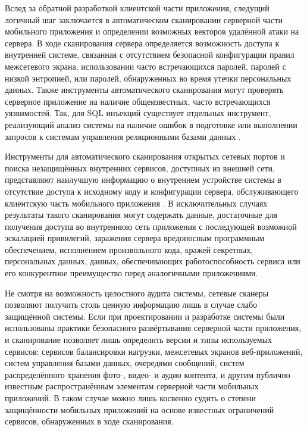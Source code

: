 Вслед за обратной разработкой клиентской части приложения, следущий логичный шаг заключается в автоматическом сканировании серверной части мобильного приложения и определении возможных векторов удалённой атаки на сервера. В ходе сканирования сервера определяется возможность доступа к внутренней системе, связанная с отсутствием безопасной конфигурации правил межсетевого экрана, использовании часто встречающихся паролей, паролей с низкой энтропией, или паролей, обнаруженных во время утечки персональных данных. Также инструменты автоматического сканирования могут проверять серверное приложение на наличие общеизвестных, часто встречающихся уязвимостей. Так, для SQL инъекций существует отдельных инструмент, реализующий анализ системы на наличие ошибок в подготовке или выполнении запросов к системам управления реляционными базами данных \cite{sqlmap}.

Инструменты для автоматического сканирования открытых сетевых портов и поиска незащищённых внутренних сервисов, доступных из внешней сети, представляют наилучшую информацию о внутреннем устройстве системы в отсутствие доступа к исходному коду и конфигурации сервера, обслуживающего клиентскую часть мобильного приложения \cite{portswigger_burp}. В исключительных случаях результаты такого сканирования могут содержать данные, достаточные для получения доступа во внутреннюю сеть приложения с последующей возможной эскалацией привилегий, заражения сервера вредоносным программным обеспечением, исполнением произвольного кода, кражей секретных, персональных данных, данных, обеспечивающих работоспособность сервиса или его конкурентное преимущество перед аналогичными приложениями.

Не смотря на возможность целостного аудита системы, сетевые сканеры позволяют получить столь ценную информацию лишь в случае слабо защищённой системы. Если при проектировании и разработке системы были использованы практики безопасного развёртывания серверной части приложения, и сканирование позволяет лишь определить версии и типы используемых сервисов: сервисов балансировки нагрузки, межсетевых экранов веб-приложений, систем управления базами данных, очередями сообщений, систем распределённого хранения фото-, видео- и аудио контента, и другим публично известным распространённым элементам серверной части мобильных приложений. В таком случае можно лишь косвенно судить о степени защищённости мобильных приложений на основе известных ограничений сервисов, обнаруженных в ходе сканирования.

